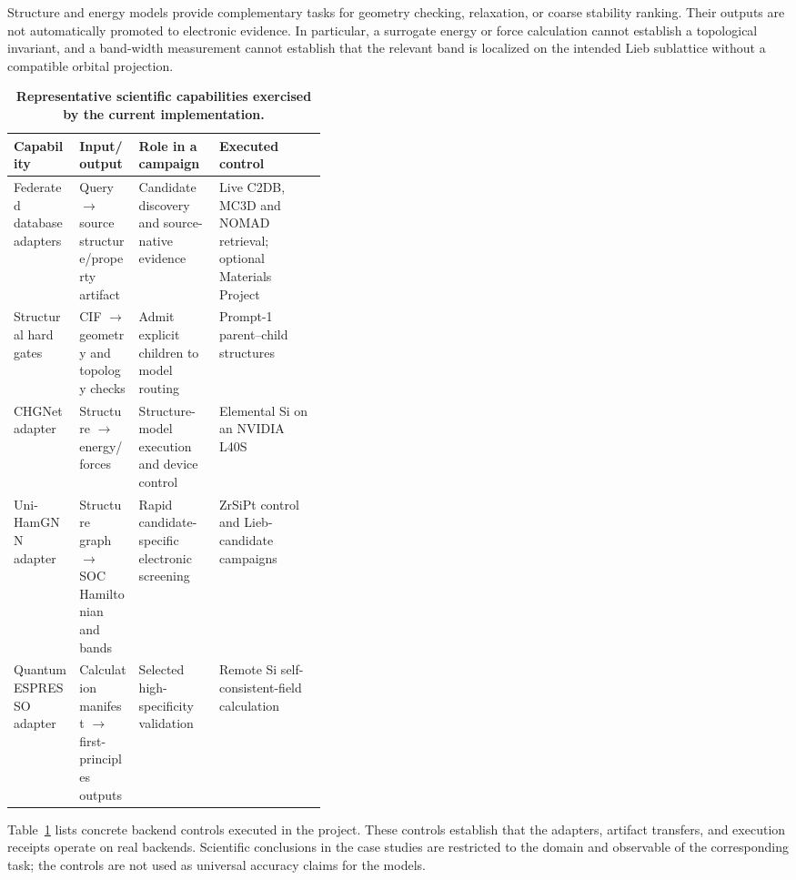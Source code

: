 Structure and energy models provide complementary tasks for geometry checking, relaxation, or coarse stability ranking.  Their outputs are not automatically promoted to electronic evidence.  In particular, a surrogate energy or force calculation cannot establish a topological invariant, and a band-width measurement cannot establish that the relevant band is localized on the intended Lieb sublattice without a compatible orbital projection.

\begin{table}[t]
    \centering
    \caption{\textbf{Representative scientific capabilities exercised by the current implementation.}}
    \label{tab:capabilities}
    \small
    \setlength{\tabcolsep}{4pt}
    \renewcommand{\arraystretch}{1.13}
    \begin{tabularx}{\linewidth}{>{\raggedright\arraybackslash}p{0.21\linewidth}>{\raggedright\arraybackslash}p{0.19\linewidth}XX}
        \toprule
        \textbf{Capability} & \textbf{Input/output} & \textbf{Role in a campaign} & \textbf{Executed control} \\
        \midrule
        Federated database adapters & Query $\rightarrow$ source structure/property artifact & Candidate discovery and source-native evidence & Live C2DB, MC3D and NOMAD retrieval; optional Materials Project \\
        Structural hard gates & CIF $\rightarrow$ geometry and topology checks & Admit explicit children to model routing & Prompt-1 parent--child structures \\
        CHGNet adapter & Structure $\rightarrow$ energy/forces & Structure-model execution and device control & Elemental Si on an NVIDIA L40S \\
        Uni-HamGNN adapter & Structure graph $\rightarrow$ SOC Hamiltonian and bands & Rapid candidate-specific electronic screening & ZrSiPt control and Lieb-candidate campaigns \\
        Quantum ESPRESSO adapter & Calculation manifest $\rightarrow$ first-principles outputs & Selected high-specificity validation & Remote Si self-consistent-field calculation \\
        \bottomrule
    \end{tabularx}
\end{table}

Table~\ref{tab:capabilities} lists concrete backend controls executed in the project.  These controls establish that the adapters, artifact transfers, and execution receipts operate on real backends.  Scientific conclusions in the case studies are restricted to the domain and observable of the corresponding task; the controls are not used as universal accuracy claims for the models.

